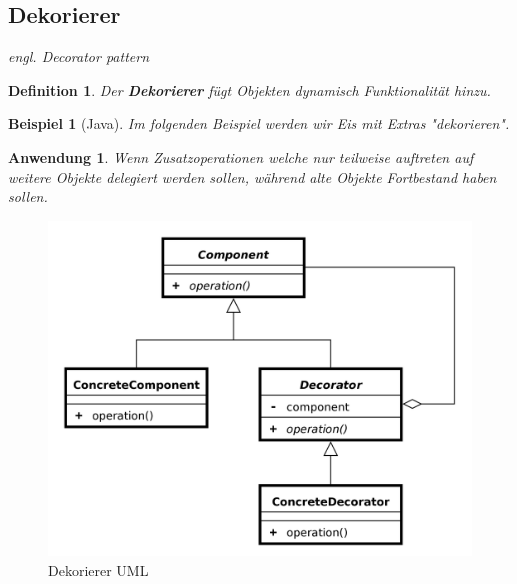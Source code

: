\documentclass[a4paper]{article}
\theoremstyle{break}
\newtheorem{defi}{Definition}[section]
\newtheorem{ex}{Beispiel}[section]
\newtheorem{why}{Anwendung}[section]
\begin{document}
\newpage
\subsection{Dekorierer}

\textit{engl. Decorator pattern}

\begin{defi}
	Der \textbf{Dekorierer} fügt Objekten dynamisch Funktionalität hinzu.
\end{defi}

\begin{ex}[Java]
	Im folgenden Beispiel werden wir Eis mit Extras "dekorieren".
	
	
	
	
	
	
	
	
	
\end{ex}

\begin{why}
	Wenn Zusatzoperationen welche nur teilweise auftreten auf weitere Objekte delegiert werden sollen, während alte Objekte Fortbestand haben sollen.
\end{why}
\begin{figure}[H]
	\centering
	\includegraphics[width=\textwidth]{../diagrams/uml/DecoratorPattern.png}
	\caption{Dekorierer UML}
\end{figure}
\end{document}
